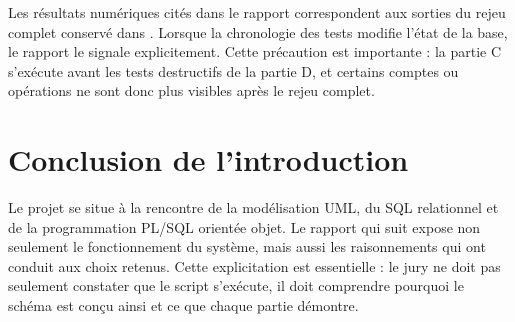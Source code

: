 Les résultats numériques cités dans le rapport correspondent aux sorties du
rejeu complet conservé dans . Lorsque la chronologie
des tests modifie l'état de la base, le rapport le signale explicitement. Cette
précaution est importante : la partie C s'exécute avant les tests destructifs
de la partie D, et certains comptes ou opérations ne sont donc plus visibles
après le rejeu complet.

\section*{Conclusion de l'introduction}

Le projet se situe à la rencontre de la modélisation UML, du SQL relationnel
et de la programmation PL/SQL orientée objet. Le rapport qui suit expose non
seulement le fonctionnement du système, mais aussi les raisonnements qui ont
conduit aux choix retenus. Cette explicitation est essentielle : le jury ne
doit pas seulement constater que le script s'exécute, il doit comprendre
pourquoi le schéma est conçu ainsi et ce que chaque partie démontre.
